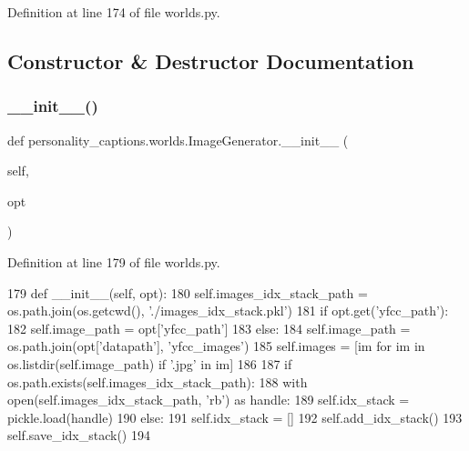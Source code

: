 Definition at line 174 of file worlds.\+py.



\subsection{Constructor \& Destructor Documentation}
\mbox{\label{classpersonality__captions_1_1worlds_1_1ImageGenerator_adeb74aa2ebf4ace2c39ab7f811629b98}} 
\subsubsection{\texorpdfstring{\+\_\+\+\_\+init\+\_\+\+\_\+()}{\_\_init\_\_()}}
{\footnotesize\ttfamily def personality\+\_\+captions.\+worlds.\+Image\+Generator.\+\_\+\+\_\+init\+\_\+\+\_\+ (\begin{DoxyParamCaption}\item[{}]{self,  }\item[{}]{opt }\end{DoxyParamCaption})}



Definition at line 179 of file worlds.\+py.


\begin{DoxyCode}
179     \textcolor{keyword}{def }\_\_init\_\_(self, opt):
180         self.images\_idx\_stack\_path = os.path.join(os.getcwd(), \textcolor{stringliteral}{'./images\_idx\_stack.pkl'})
181         \textcolor{keywordflow}{if} opt.get(\textcolor{stringliteral}{'yfcc\_path'}):
182             self.image\_path = opt[\textcolor{stringliteral}{'yfcc\_path'}]
183         \textcolor{keywordflow}{else}:
184             self.image\_path = os.path.join(opt[\textcolor{stringliteral}{'datapath'}], \textcolor{stringliteral}{'yfcc\_images'})
185         self.images = [im \textcolor{keywordflow}{for} im \textcolor{keywordflow}{in} os.listdir(self.image\_path) \textcolor{keywordflow}{if} \textcolor{stringliteral}{'.jpg'} \textcolor{keywordflow}{in} im]
186 
187         \textcolor{keywordflow}{if} os.path.exists(self.images\_idx\_stack\_path):
188             with open(self.images\_idx\_stack\_path, \textcolor{stringliteral}{'rb'}) \textcolor{keyword}{as} handle:
189                 self.idx\_stack = pickle.load(handle)
190         \textcolor{keywordflow}{else}:
191             self.idx\_stack = []
192             self.add\_idx\_stack()
193             self.save\_idx\_stack()
194 
\end{DoxyCode}


